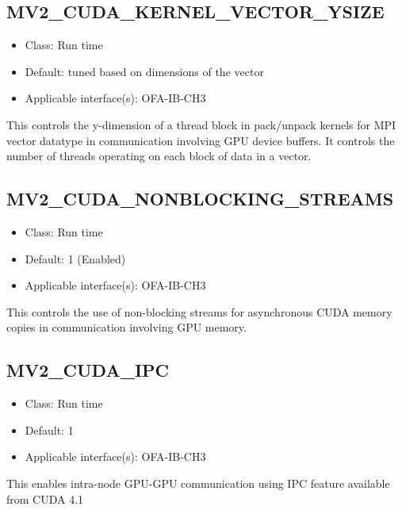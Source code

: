 \subsection{MV2\_CUDA\_KERNEL\_VECTOR\_YSIZE}
\label{def:cuda-kernel-vector-ysize}

\begin{itemize}
        \item Class: Run time
        \item Default: tuned based on dimensions of the vector
        \item Applicable interface(s): OFA-IB-CH3
\end{itemize}
This controls the y-dimension of a thread block in pack/unpack kernels for MPI vector datatype in communication
involving GPU device buffers. It controls the number of threads operating on each block of data in a vector.

\subsection{MV2\_CUDA\_NONBLOCKING\_STREAMS}
\label{def:cuda-nonblocking-streams}

\begin{itemize}
        \item Class: Run time
        \item Default: 1 (Enabled)
        \item Applicable interface(s): OFA-IB-CH3
\end{itemize}
This controls the use of non-blocking streams for asynchronous CUDA memory copies in communication involving GPU memory.

\subsection{MV2\_CUDA\_IPC}
\label{def:cuda-ipc}

\begin{itemize}
        \item Class: Run time
        \item Default: 1
        \item Applicable interface(s): OFA-IB-CH3
\end{itemize}
This enables intra-node GPU-GPU communication using IPC feature available from CUDA 4.1

%

